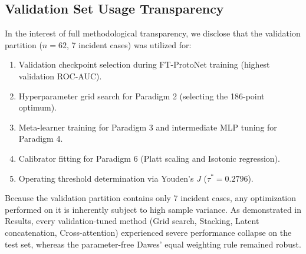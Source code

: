 \documentclass[10pt,letterpaper]{article}
\begin{document}
        \subsection*{Validation Set Usage Transparency}
        In the interest of full methodological transparency, we disclose that the validation partition ($n=62$, 7 incident cases) was utilized for:
        \begin{enumerate}
            \item Validation checkpoint selection during FT-ProtoNet training (highest validation ROC-AUC).
            \item Hyperparameter grid search for Paradigm 2 (selecting the 186-point optimum).
            \item Meta-learner training for Paradigm 3 and intermediate MLP tuning for Paradigm 4.
            \item Calibrator fitting for Paradigm 6 (Platt scaling and Isotonic regression).
            \item Operating threshold determination via Youden's $J$ ($\tau^* = 0.2796$).
        \end{enumerate}
        Because the validation partition contains only 7 incident cases, any optimization performed on it is inherently subject to high sample variance. As demonstrated in Results, every validation-tuned method (Grid search, Stacking, Latent concatenation, Cross-attention) experienced severe performance collapse on the test set, whereas the parameter-free Dawes' equal weighting rule remained robust.
\end{document}

